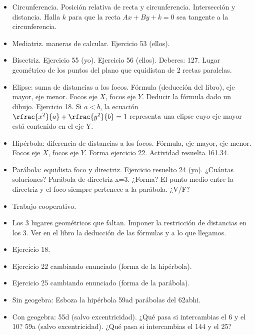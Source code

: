 \begin{itemize}
	\item Circunferencia.
	\subitem Posición relativa de recta y circunferencia. Intersección y distancia.
	\subitem Halla $k$ para que la recta $Ax+By+k=0$ sea tangente a la circunferencia.
	\item Mediatriz.
	 maneras de calcular. Ejercicio 53 (ellos).
	\item Bisectriz. 
	\subitem Ejercicio 55 (yo).
	\subitem Ejercicio 56 (ellos).
	\subitem Deberes: 127.
	\subitem Lugar geométrico de los puntos del plano que equidistan de 2 rectas paralelas.
	\item Elipse: suma de distancias a los focos.
	\subitem Fórmula (deducción del libro), eje mayor, eje menor.
	\subitem Focos eje $X$, focos eje $Y$.
	\subitem Deducir la fórmula dado un dibujo.
	\subitem Ejercicio 18.
	\subitem Si $a<b$, la ecuación $\rfrac{x^2}{a} + \rfrac{y^2}{b} = 1$ representa una elipse cuyo eje mayor está contenido en el eje Y.
	\item Hipérbola: diferencia de distancias a los focos.
	\subitem Fórmula, eje mayor, eje menor.
	\subitem Focos eje $X$, focos eje $Y$.
	\subitem Forma ejercicio 22.
	\subitem Actividad resuelta 161.34.
	\item Parábola: equidista foco y directriz.
	\subitem Ejercicio resuelto 24 (yo). ¿Cuántas soluciones?
	\subitem Parábola de directriz x=3. ¿Forma?
	\subitem El punto medio entre la directriz y el foco siempre pertenece a la parábola. ¿V/F?
\end{itemize}


\begin{itemize}
	\item Trabajo cooperativo. 
	\item Los 3 lugares geométricos que faltan. Imponer la restricción de distancias en los 3. Ver en el libro la deducción de las fórmulas y a lo que llegamos.
	\item Ejercicio 18.
	\item Ejercicio 22 cambiando enunciado (forma de la hipérbola).
	\item Ejercicio 25 cambiando enunciado (forma de la parábola).
	\item Sin geogebra:
		\subitem Esboza la hipérbola 59ad parábolas del 62abhi.
	\item Con geogebra: 
		\subitem 55d (salvo excentricidad). ¿Qué pasa si intercambias el 6 y el 10? 
		\subitem 59a (salvo excentricidad). ¿Qué pasa si intercambias el 144 y el 25?

\end{itemize}

